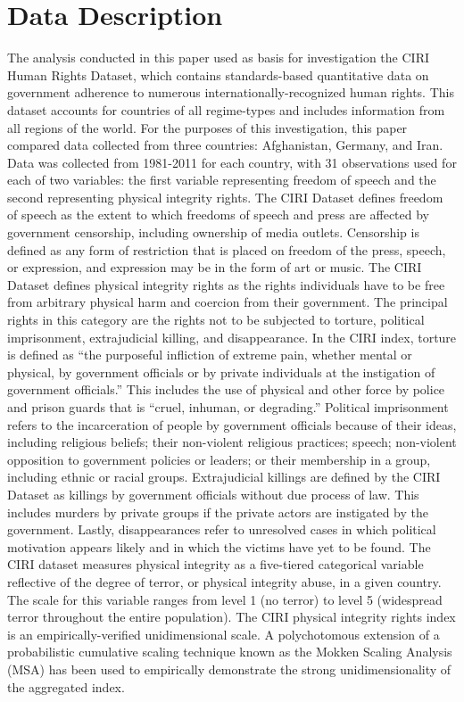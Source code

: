 \documentclass{article}
\begin{document}
\section{Data Description}
The analysis conducted in this paper used as basis for investigation the CIRI Human Rights Dataset, which contains standards-based quantitative data on government adherence to numerous internationally-recognized human rights. This dataset accounts for countries of all regime-types and includes information from all regions of the world. For the purposes of this investigation, this paper compared data collected from three countries: Afghanistan, Germany, and Iran. Data was collected from 1981-2011 for each country, with 31 observations used for each of two variables: the first variable representing freedom of speech and the second representing physical integrity rights. 
The CIRI Dataset defines freedom of speech as the extent to which freedoms of speech and press are affected by government censorship, including ownership of media outlets. Censorship is defined as any form of restriction that is placed on freedom of the press, speech, or expression, and expression may be in the form of art or music. 
The CIRI Dataset defines physical integrity rights as the rights individuals have to be free from arbitrary physical harm and coercion from their government. The principal rights in this category are the rights not to be subjected to torture, political imprisonment, extrajudicial killing, and disappearance. In the CIRI index, torture is defined as “the purposeful infliction of extreme pain, whether mental or physical, by government officials or by private individuals at the instigation of government officials.” This includes the use of physical and other force by police and prison guards that is “cruel, inhuman, or degrading.” Political imprisonment refers to the incarceration of people by government officials because of their ideas, including religious beliefs; their non-violent religious practices; speech; non-violent opposition to government policies or leaders; or their membership in a group, including ethnic or racial groups. Extrajudicial killings are defined by the CIRI Dataset as killings by government officials without due process of law. This includes murders by private groups if the private actors are instigated by the government. Lastly, disappearances refer to unresolved cases in which political motivation appears likely and in which the victims have yet to be found. The CIRI dataset measures physical integrity as a five-tiered categorical variable reflective of the degree of terror, or physical integrity abuse, in a given country. The scale for this variable ranges from level 1 (no terror) to level 5 (widespread terror throughout the entire population). 
The CIRI physical integrity rights index is an empirically-verified unidimensional scale. A polychotomous extension of a probabilistic cumulative scaling technique known as the Mokken Scaling Analysis (MSA) has been used to empirically demonstrate the strong unidimensionality of the aggregated index.
\end{document}
